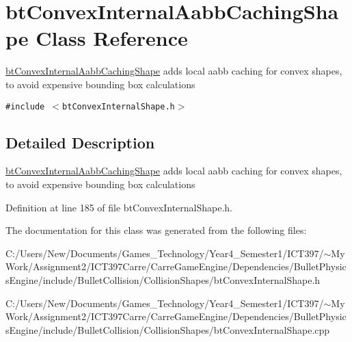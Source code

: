 \hypertarget{classbt_convex_internal_aabb_caching_shape}{
\section{btConvexInternalAabbCachingShape Class Reference}
\label{classbt_convex_internal_aabb_caching_shape}
}
\hyperlink{classbt_convex_internal_aabb_caching_shape}{btConvexInternalAabbCachingShape} adds local aabb caching for convex shapes, to avoid expensive bounding box calculations  


{\tt \#include $<$btConvexInternalShape.h$>$}



\subsection{Detailed Description}
\hyperlink{classbt_convex_internal_aabb_caching_shape}{btConvexInternalAabbCachingShape} adds local aabb caching for convex shapes, to avoid expensive bounding box calculations 

Definition at line 185 of file btConvexInternalShape.h.

The documentation for this class was generated from the following files:\begin{CompactItemize}
\item 
C:/Users/New/Documents/Games\_\-Technology/Year4\_\-Semester1/ICT397/$\sim$My Work/Assignment2/ICT397Carre/CarreGameEngine/Dependencies/BulletPhysicsEngine/include/BulletCollision/CollisionShapes/btConvexInternalShape.h\item 
C:/Users/New/Documents/Games\_\-Technology/Year4\_\-Semester1/ICT397/$\sim$My Work/Assignment2/ICT397Carre/CarreGameEngine/Dependencies/BulletPhysicsEngine/include/BulletCollision/CollisionShapes/btConvexInternalShape.cpp\end{CompactItemize}
